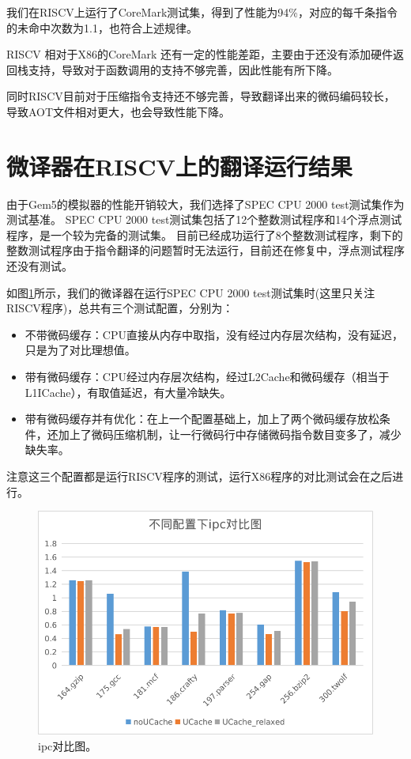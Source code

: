 我们在RISCV上运行了CoreMark测试集，得到了性能为94\%，对应的每千条指令的未命中次数为1.1，也符合上述规律。

RISCV 相对于X86的CoreMark 还有一定的性能差距，主要由于还没有添加硬件返回栈支持，导致对于函数调用的支持不够完善，因此性能有所下降。

同时RISCV目前对于压缩指令支持还不够完善，导致翻译出来的微码编码较长，导致AOT文件相对更大，也会导致性能下降。


\section{微译器在RISCV上的翻译运行结果}
由于Gem5的模拟器的性能开销较大，我们选择了SPEC CPU 2000 test测试集作为测试基准。
SPEC CPU 2000 test测试集包括了12个整数测试程序和14个浮点测试程序，是一个较为完备的测试集。
目前已经成功运行了8个整数测试程序，剩下的整数测试程序由于指令翻译的问题暂时无法运行，目前还在修复中，浮点测试程序还没有测试。

如图\ref{img:ipc}所示，我们的微译器在运行SPEC CPU 2000 test测试集时(这里只关注RISCV程序)，总共有三个测试配置，分别为：
\begin{itemize}
  \item 不带微码缓存：CPU直接从内存中取指，没有经过内存层次结构，没有延迟，只是为了对比理想值。
  \item 带有微码缓存：CPU经过内存层次结构，经过L2Cache和微码缓存（相当于L1ICache），有取值延迟，有大量冷缺失。
  \item 带有微码缓存并有优化：在上一个配置基础上，加上了两个微码缓存放松条件，还加上了微码压缩机制，让一行微码行中存储微码指令数目变多了，减少缺失率。
\end{itemize}
注意这三个配置都是运行RISCV程序的测试，运行X86程序的对比测试会在之后进行。

\begin{figure}[!htbp]
  \centering
  \includegraphics[width=0.8\linewidth]{./plot/ipc.png}
  \caption{ipc对比图。}
  \label{img:ipc}
\end{figure}

